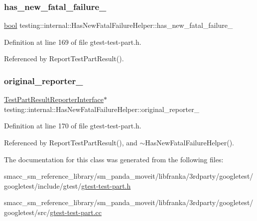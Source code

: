 \subsubsection{\texorpdfstring{has\+\_\+new\+\_\+fatal\+\_\+failure\+\_\+}{has\_new\_fatal\_failure\_}}
{\footnotesize\ttfamily \hyperlink{classbool}{bool} testing\+::internal\+::\+Has\+New\+Fatal\+Failure\+Helper\+::has\+\_\+new\+\_\+fatal\+\_\+failure\+\_\+\hspace{0.3cm}{\ttfamily [private]}}



Definition at line 169 of file gtest-\/test-\/part.\+h.



Referenced by Report\+Test\+Part\+Result().

\mbox{\label{classtesting_1_1internal_1_1HasNewFatalFailureHelper_a9f8be46b6aa39666e4a8557f240629e5}} 
\subsubsection{\texorpdfstring{original\+\_\+reporter\+\_\+}{original\_reporter\_}}
{\footnotesize\ttfamily \hyperlink{classtesting_1_1TestPartResultReporterInterface}{Test\+Part\+Result\+Reporter\+Interface}$\ast$ testing\+::internal\+::\+Has\+New\+Fatal\+Failure\+Helper\+::original\+\_\+reporter\+\_\+\hspace{0.3cm}{\ttfamily [private]}}



Definition at line 170 of file gtest-\/test-\/part.\+h.



Referenced by Report\+Test\+Part\+Result(), and $\sim$\+Has\+New\+Fatal\+Failure\+Helper().



The documentation for this class was generated from the following files\+:\begin{DoxyCompactItemize}
\item 
smacc\+\_\+sm\+\_\+reference\+\_\+library/sm\+\_\+panda\+\_\+moveit/libfranka/3rdparty/googletest/googletest/include/gtest/\hyperlink{gtest-test-part_8h}{gtest-\/test-\/part.\+h}\item 
smacc\+\_\+sm\+\_\+reference\+\_\+library/sm\+\_\+panda\+\_\+moveit/libfranka/3rdparty/googletest/googletest/src/\hyperlink{gtest-test-part_8cc}{gtest-\/test-\/part.\+cc}\end{DoxyCompactItemize}
